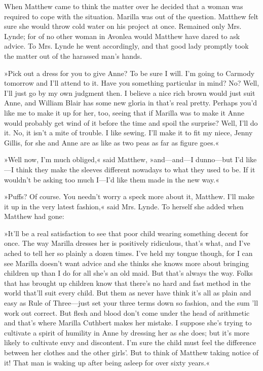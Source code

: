 When Matthew came to think the matter over he decided that a woman was required to cope with the situation. Marilla was out of the question. Matthew felt sure she would throw cold water on his project at once. Remained only Mrs. Lynde; for of no other woman in Avonlea would Matthew have dared to ask advice. To Mrs. Lynde he went accordingly, and that good lady promptly took the matter out of the harassed man's hands.

»Pick out a dress for you to give Anne? To be sure I will. I'm going to Carmody tomorrow and I'll attend to it. Have you something particular in mind? No? Well, I'll just go by my own judgment then. I believe a nice rich brown would just suit Anne, and William Blair has some new gloria in that's real pretty. Perhaps you'd like me to make it up for her, too, seeing that if Marilla was to make it Anne would probably get wind of it before the time and spoil the surprise? Well, I'll do it. No, it isn't a mite of trouble. I like sewing. I'll make it to fit my niece, Jenny Gillis, for she and Anne are as like as two peas as far as figure goes.«

»Well now, I'm much obliged,« said Matthew, »and—and—I dunno—but I'd like—I think they make the sleeves different nowadays to what they used to be. If it wouldn't be asking too much I—I'd like them made in the new way.«

»Puffs? Of course. You needn't worry a speck more about it, Matthew. I'll make it up in the very latest fashion,« said Mrs. Lynde. To herself she added when Matthew had gone:

»It'll be a real satisfaction to see that poor child wearing something decent for once. The way Marilla dresses her is positively ridiculous, that's what, and I've ached to tell her so plainly a dozen times. I've held my tongue though, for I can see Marilla doesn't want advice and she thinks she knows more about bringing children up than I do for all she's an old maid. But that's always the way. Folks that has brought up children know that there's no hard and fast method in the world that'll suit every child. But them as never have think it's all as plain and easy as Rule of Three—just set your three terms down so fashion, and the sum 'll work out correct. But flesh and blood don't come under the head of arithmetic and that's where Marilla Cuthbert makes her mistake. I suppose she's trying to cultivate a spirit of humility in Anne by dressing her as she does; but it's more likely to cultivate envy and discontent. I'm sure the child must feel the difference between her clothes and the other girls'. But to think of Matthew taking notice of it! That man is waking up after being asleep for over sixty years.«

